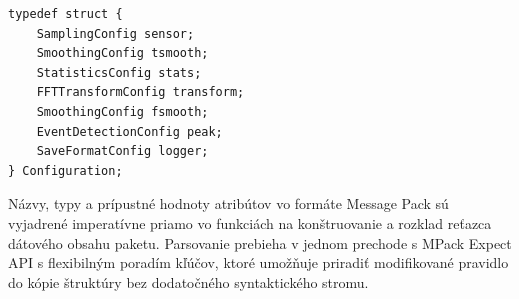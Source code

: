 \begin{lstlisting}[style=cstyle,label={config:struct},caption=Štruktúra systémovej konfigurácie,
morekeywords={Configuration}]
typedef struct {
    SamplingConfig sensor;
    SmoothingConfig tsmooth;
    StatisticsConfig stats;
    FFTTransformConfig transform;
    SmoothingConfig fsmooth;
    EventDetectionConfig peak;
    SaveFormatConfig logger;
} Configuration;
\end{lstlisting}

Názvy, typy a prípustné hodnoty atribútov vo formáte Message Pack sú vyjadrené imperatívne priamo vo funkciách
na konštruovanie a rozklad reťazca dátového obsahu paketu. Parsovanie prebieha v jednom prechode s MPack Expect API
s flexibilným poradím kľúčov, ktoré umožňuje priradiť modifikované pravidlo do kópie štruktúry bez dodatočného
syntaktického stromu.
